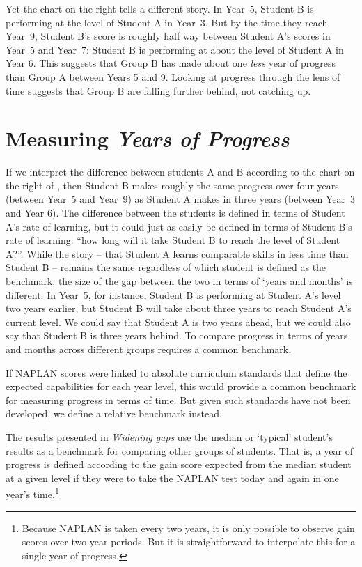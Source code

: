 Yet the chart on the right tells a different story. In \mbox{Year 5}, Student B is performing at the level of Student A in \mbox{Year 3}. But by the time they reach \mbox{Year 9}, Student B's score is roughly half way between Student A's scores in \mbox{Year 5} and \mbox{Year 7}: Student B is performing at about the level of Student A in Year 6. This suggests that Group B has made about one \textit{less} year of progress than Group A between Years 5 and 9. Looking at progress through the lens of time suggests that Group B are falling further behind, not catching up.

\newpage
\section{Measuring \textit{Years of Progress}}

If we interpret the difference between students A and B according to the chart on the right of , then Student B makes roughly the same progress over four years (between \mbox{Year 5} and \mbox{Year 9}) as Student A makes in three years (between \mbox{Year 3} and Year 6). The difference between the students is defined in terms of Student A's rate of learning, but it could just as easily be defined in terms of Student B's rate of learning: ``how long will it take Student B to reach the level of Student A?''. While the story -- that Student A learns comparable skills in less time than Student B -- remains the same regardless of which student is defined as the benchmark, the size of the gap between the two in terms of `years and months' is different. In \mbox{Year 5}, for instance, Student B is performing at Student A's level two years earlier, but Student B will take about three years to reach Student A's current level. We could say that Student A is two years ahead, but we could also say that Student B is three years behind. To compare progress in terms of years and months across different groups requires a common benchmark. 

If NAPLAN scores were linked to absolute curriculum standards that define the expected capabilities for each year level, this would provide a common benchmark for measuring progress in terms of time. But given such standards have not been developed, we define a relative benchmark instead.

The results presented in \textit{Widening gaps} use the median or `typical' student's results as a benchmark for comparing other groups of students. That is, a year of progress is defined according to the gain score expected from the median student at a given level if they were to take the NAPLAN test today and again in one year's time.\footnote{Because NAPLAN is taken every two years, it is only possible to observe gain scores over two-year periods. But it is straightforward to interpolate this for a single year of progress.}

